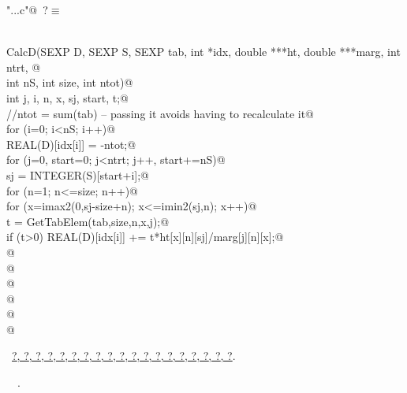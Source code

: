 \documentclass[reqno]{amsart}
\renewcommand{\NWtarget}[2]{\hypertarget{#1}{#2}}
\renewcommand{\NWlink}[2]{\hyperlink{#1}{#2}}
\begin{document}
\begin{flushleft} \small\label{scrap25}\raggedright\small
\NWtarget{nuweb?}{} \verb@"..\src\ReprodCalcs.c"@\nobreak\ {\footnotesize {?}}$\equiv$
\vspace{-1ex}
\begin{list}{}{} \item
\mbox{}\verb@@\\
\mbox{}\verb@void CalcD(SEXP D, SEXP S, SEXP tab, int *idx, double ***ht, double ***marg, int ntrt, @\\
\mbox{}\verb@           int nS, int size, int ntot){@\\
\mbox{}\verb@   int j, i, n, x, sj, start, t;@\\
\mbox{}\verb@         //ntot = sum(tab) -- passing it avoids having to recalculate it@\\
\mbox{}\verb@         for (i=0; i<nS; i++){@\\
\mbox{}\verb@                 REAL(D)[idx[i]] = -ntot;@\\
\mbox{}\verb@                 for (j=0, start=0; j<ntrt; j++, start+=nS){@\\
\mbox{}\verb@                         sj = INTEGER(S)[start+i];@\\
\mbox{}\verb@                         for (n=1; n<=size; n++){@\\
\mbox{}\verb@                                 for (x=imax2(0,sj-size+n); x<=imin2(sj,n); x++){@\\
\mbox{}\verb@                                         t = GetTabElem(tab,size,n,x,j);@\\
\mbox{}\verb@                                         if (t>0) REAL(D)[idx[i]] += t*ht[x][n][sj]/marg[j][n][x];@\\
\mbox{}\verb@                                 }@\\
\mbox{}\verb@                         }@\\
\mbox{}\verb@                 }@\\
\mbox{}\verb@         }@\\
\mbox{}\verb@         @\\
\mbox{}\verb@ }@\\
\mbox{}\verb@@{\NWsep}
\end{list}
\vspace{-1.5ex}
\footnotesize
\begin{list}{}{\setlength{\itemsep}{-\parsep}\setlength{\itemindent}{-\leftmargin}}
\item \NWtxtFileDefBy\ \NWlink{nuweb?}{?}\NWlink{nuweb?}{, ?}\NWlink{nuweb?}{, ?}\NWlink{nuweb?}{, ?}\NWlink{nuweb?}{, ?}\NWlink{nuweb?}{, ?}\NWlink{nuweb?}{, ?}\NWlink{nuweb?}{, ?}\NWlink{nuweb?}{, ?}\NWlink{nuweb?}{, ?}\NWlink{nuweb?}{, ?}\NWlink{nuweb?}{, ?}\NWlink{nuweb?}{, ?}\NWlink{nuweb?}{, ?}\NWlink{nuweb?}{, ?}\NWlink{nuweb?}{, ?}\NWlink{nuweb?}{, ?}\NWlink{nuweb?}{, ?}\NWlink{nuweb?}{, ?}.
\item \NWtxtIdentsDefed\nobreak\  \verb@calcD@\nobreak\ \NWtxtIdentsNotUsed.
\item{}
\end{list}
\vspace{4ex}
\end{flushleft}
\end{document}
